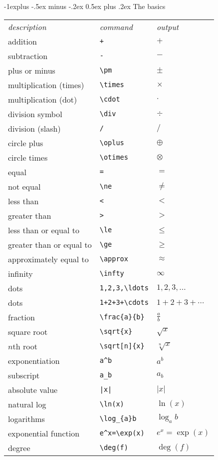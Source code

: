 \documentclass[10pt,landscape]{article}
\makeatletter
\renewcommand{\subsection}{\@startsection{subsection}{2}{0mm}%
                                {-1explus -.5ex minus -.2ex}%
                                {0.5ex plus .2ex}%
                                {\normalfont\normalsize\bfseries}}
\makeatother
\begin{document}
\begin{multicols}{3}
\subsection{The basics}
\begin{tabular}{lll}
\emph{description} & \emph{command} & \emph{output}\\
addition & \verb!+! & $+$\\
subtraction & \verb!-! & $-$\\
plus or minus & \verb!\pm! & $\pm$\\
multiplication (times) & \verb!\times! & $\times$\\
multiplication (dot) & \verb!\cdot! & $\cdot$\\
division symbol & \verb!\div! & $\div$\\
division (slash) & \verb!/! & $/$\\
circle plus & \verb!\oplus! & $\oplus$\\
circle times & \verb!\otimes! & $\otimes$\\
equal & \verb!=! & $=$\\
not equal & \verb!\ne! & $\ne$\\
less than & \verb!<! & $<$\\
greater than & \verb!>! & $>$\\
less than or equal to & \verb!\le! & $\le$\\
greater than or equal to & \verb!\ge! & $\ge$\\
approximately equal to & \verb!\approx! & $\approx$\\
infinity & \verb!\infty! & $\infty$\\
dots & \verb!1,2,3,\ldots! & $1,2,3,\ldots$\\
dots & \verb!1+2+3+\cdots! & $1+2+3+\cdots$\\
fraction & \verb!\frac{a}{b}! & $\frac{a}{b}$\\
square root & \verb!\sqrt{x}! & $\sqrt{x}$\\
$n$th root & \verb!\sqrt[n]{x}! & $\sqrt[n]{x}$\\
exponentiation & \verb!a^b! & $a^{b}$\\
subscript & \verb!a_b! & $a_{b}$\\
absolute value & \verb!|x|! & $|x|$\\
natural log  & \verb!\ln(x)! & $\ln(x)$\\
logarithms & \verb!\log_{a}b! & $\log_{a}b$\\
exponential function & \verb!e^x=\exp(x)! & $e^{x}=\exp(x)$\\
degree & \verb!\deg(f)! & $\deg(f)$\\
\end{tabular}
\newpage


\end{multicols}
\end{document}
